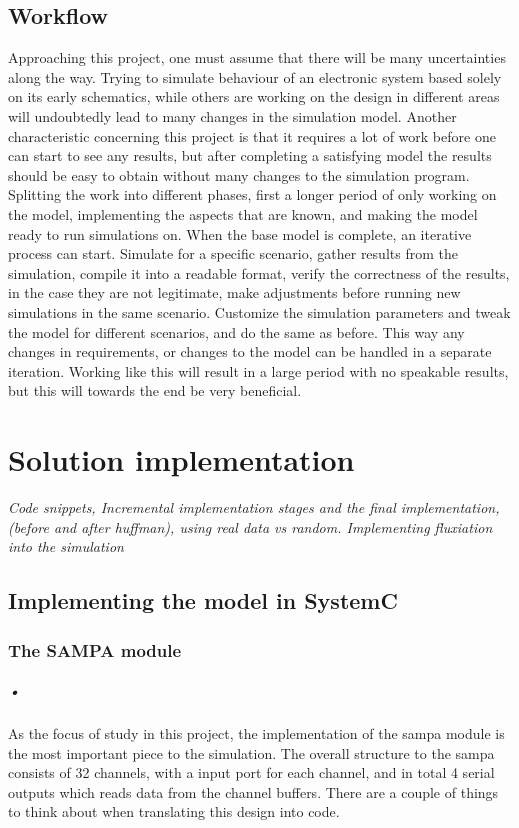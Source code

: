 \documentclass[a4paper, 12pt]{report}
\begin{document}
\section{Workflow}
Approaching this project, one must assume that there will be many uncertainties along the way.
Trying to simulate behaviour of an electronic system based solely on its early schematics, while others are working on the design in different areas will undoubtedly lead to many changes in the simulation model.
Another characteristic concerning this project is that it requires a lot of work before one can start to see any results, but after completing a satisfying  model the results should be easy to obtain without many changes to the simulation program.
Splitting the work into different phases, first a longer period of only working on the model, implementing the aspects that are known, and making the model ready to run simulations on.
When the base model is complete, an iterative process can start.
Simulate for a specific scenario, gather results from the simulation, compile it into a readable format, verify the correctness of the results, in the case they are not legitimate, make adjustments before running new simulations in the same scenario.
Customize the simulation parameters and tweak the model for different scenarios, and do the same as before.
This way any changes in requirements, or changes to the model can be handled in a separate iteration.
Working like this will result in a large period with no speakable results, but this will towards the end be very beneficial.

\chapter{Solution implementation}
\textit{Code snippets, Incremental implementation stages and the final implementation, (before and after huffman), using real data vs random. Implementing fluxiation into the simulation}
\section{Implementing the model in SystemC}

\subsection{The SAMPA module}

\paragraph{•}
As the focus of study in this project, the implementation of the \gls{sampa} module is the most important piece to the simulation.
The overall structure to the \gls{sampa} consists of 32 channels, with a input port for each channel, and in total 4 serial outputs which reads data from the channel buffers.
There are a couple of things to think about when translating this design into code.
\end{document}
